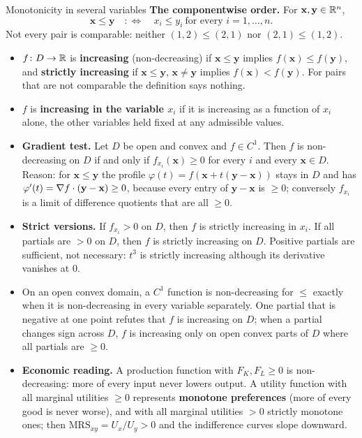 \begin{rulebox}{Monotonicity in several variables}
\textbf{The componentwise order.} For $\mathbf{x},\mathbf{y}\in\mathbb{R}^{n}$,
\[
  \mathbf{x}\le\mathbf{y}
  \quad:\Longleftrightarrow\quad
  x_{i}\le y_{i}\ \text{for every } i=1,\ldots,n .
\]
Not every pair is comparable: neither $(1,2)\le(2,1)$ nor $(2,1)\le(1,2)$.
\begin{itemize}[leftmargin=1.6em,itemsep=0.3ex]
  \item $f\colon D\to\mathbb{R}$ is \textbf{increasing} (non-decreasing) if
        $\mathbf{x}\le\mathbf{y}$ implies $f(\mathbf{x})\le f(\mathbf{y})$,
        and \textbf{strictly increasing} if $\mathbf{x}\le\mathbf{y}$,
        $\mathbf{x}\neq\mathbf{y}$ implies $f(\mathbf{x})<f(\mathbf{y})$.
        For pairs that are not comparable the definition says nothing.
  \item $f$ is \textbf{increasing in the variable $x_{i}$} if it is
        increasing as a function of $x_{i}$ alone, the other variables held
        fixed at any admissible values.
  \item \textbf{Gradient test.} Let $D$ be open and convex and $f\in C^{1}$.
        Then $f$ is non-decreasing on $D$ if and only if
        $f_{x_{i}}(\mathbf{x})\ge0$ for every $i$ and every
        $\mathbf{x}\in D$. Reason: for $\mathbf{x}\le\mathbf{y}$ the profile
        $\varphi(t)=f(\mathbf{x}+t(\mathbf{y}-\mathbf{x}))$ stays in $D$
        and has $\varphi'(t)=\nabla f\cdot(\mathbf{y}-\mathbf{x})\ge0$,
        because every entry of $\mathbf{y}-\mathbf{x}$ is $\ge0$; conversely
        $f_{x_{i}}$ is a limit of difference quotients that are all $\ge0$.
  \item \textbf{Strict versions.} If $f_{x_{i}}>0$ on $D$, then $f$ is
        strictly increasing in $x_{i}$. If all partials are $>0$ on $D$,
        then $f$ is strictly increasing on $D$. Positive partials are
        sufficient, not necessary: $t^{3}$ is strictly increasing although
        its derivative vanishes at $0$.
  \item On an open convex domain, a $C^{1}$ function is non-decreasing for
        $\le$ exactly when it is non-decreasing in every variable
        separately. One partial that is negative at one point refutes
        that $f$ is increasing on $D$; when a partial changes sign across
        $D$, $f$ is increasing only on open convex parts of $D$ where all
        partials are $\ge0$.
  \item \textbf{Economic reading.} A production function with
        $F_{K},F_{L}\ge0$ is non-decreasing: more of every input never
        lowers output. A utility function with all marginal utilities
        $\ge0$ represents \textbf{monotone preferences} (more of every good
        is never worse), and with all marginal utilities $>0$ strictly
        monotone ones; then $\mathrm{MRS}_{xy}=U_{x}/U_{y}>0$ and the
        indifference curves slope downward.
\end{itemize}
\end{rulebox}

